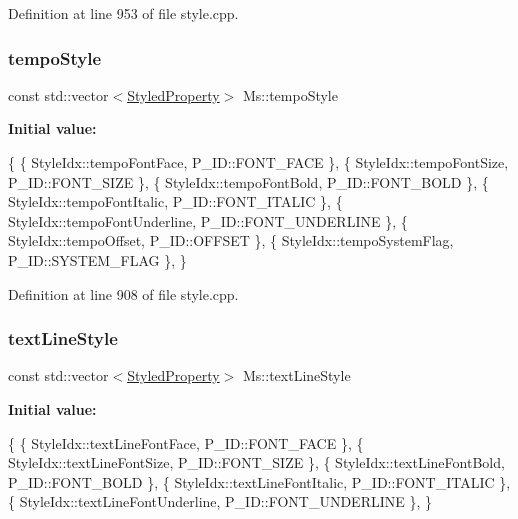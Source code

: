 Definition at line 953 of file style.\+cpp.

\mbox{\label{namespace_ms_a7f91ee052ce3f733edcbdc7c7a5100f7}} 
\subsubsection{\texorpdfstring{tempo\+Style}{tempoStyle}}
{\footnotesize\ttfamily const std\+::vector$<$\hyperlink{struct_ms_1_1_styled_property}{Styled\+Property}$>$ Ms\+::tempo\+Style}

{\bfseries Initial value\+:}
\begin{DoxyCode}
\{
      \{ StyleIdx::tempoFontFace,                      P\_ID::FONT\_FACE              \},
      \{ StyleIdx::tempoFontSize,                      P\_ID::FONT\_SIZE              \},
      \{ StyleIdx::tempoFontBold,                      P\_ID::FONT\_BOLD              \},
      \{ StyleIdx::tempoFontItalic,                    P\_ID::FONT\_ITALIC            \},
      \{ StyleIdx::tempoFontUnderline,                 P\_ID::FONT\_UNDERLINE         \},
      \{ StyleIdx::tempoOffset,                        P\_ID::OFFSET                 \},
      \{ StyleIdx::tempoSystemFlag,                    P\_ID::SYSTEM\_FLAG            \},
      \}
\end{DoxyCode}


Definition at line 908 of file style.\+cpp.

\mbox{\label{namespace_ms_a44d495e200db328f0e44492f98238d96}} 
\subsubsection{\texorpdfstring{text\+Line\+Style}{textLineStyle}}
{\footnotesize\ttfamily const std\+::vector$<$\hyperlink{struct_ms_1_1_styled_property}{Styled\+Property}$>$ Ms\+::text\+Line\+Style}

{\bfseries Initial value\+:}
\begin{DoxyCode}
\{
      \{ StyleIdx::textLineFontFace,                   P\_ID::FONT\_FACE              \},
      \{ StyleIdx::textLineFontSize,                   P\_ID::FONT\_SIZE              \},
      \{ StyleIdx::textLineFontBold,                   P\_ID::FONT\_BOLD              \},
      \{ StyleIdx::textLineFontItalic,                 P\_ID::FONT\_ITALIC            \},
      \{ StyleIdx::textLineFontUnderline,              P\_ID::FONT\_UNDERLINE         \},
      \}
\end{DoxyCode}


